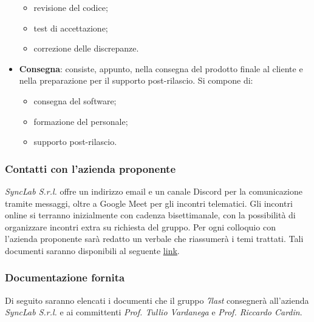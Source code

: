 \begin{itemize}
		\begin{itemize}
			\item revisione del codice;
			\item test di accettazione;
			\item correzione delle discrepanze.
		\end{itemize}
	\item \textbf{Consegna}: consiste, appunto, nella consegna del prodotto finale al cliente e nella preparazione per il supporto post-rilascio. Si compone di:
		\begin{itemize}
			\item consegna del software;
			\item formazione del personale;
			\item supporto post-rilascio.
		\end{itemize}
\end{itemize}

\subsubsection{Contatti con l'azienda proponente}
\textit{SyncLab S.r.l.} offre un indirizzo email e un canale Discord per la comunicazione tramite messaggi, oltre a Google Meet per gli incontri telematici. Gli incontri online si terranno inizialmente con cadenza bisettimanale, con la possibilità di organizzare incontri extra su richiesta del gruppo. Per ogni colloquio con l’azienda proponente sarà redatto un verbale che riassumerà i temi trattati. Tali documenti saranno disponibili al seguente \href{https://7last.github.io/docs/category/verbali-esterni}{\underline{link}}.

\subsubsection{Documentazione fornita}
Di seguito saranno elencati i documenti che il gruppo \textit{7last} consegnerà all'azienda \textit{SyncLab S.r.l.} e ai committenti \textit{Prof. Tullio Vardanega} e \textit{Prof. Riccardo Cardin}.
\newpage

